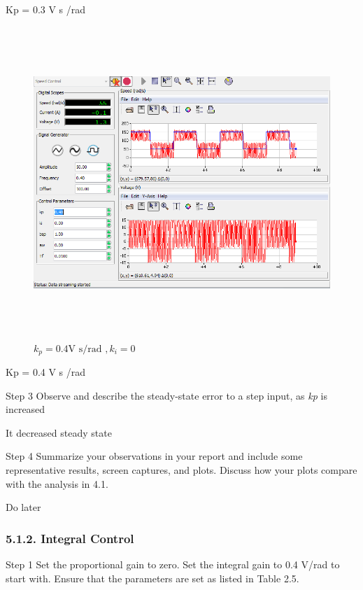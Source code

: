 \documentclass[]{article}
\begin{document}
Kp = 0.3 V s /rad

\begin{figure}\includegraphics[width=6.50000in,height=4.63889in]{media/image16.png} \caption{$k_p = 0.4 \text{V s/rad }, k_i = 0$} \end{figure}
Kp = 0.4 V s /rad

Step 3 Observe and describe the steady-state error to a step input, as
\emph{kp} is increased

It decreased steady state

Step 4 Summarize your observations in your report and include some
representative results, screen captures, and plots. Discuss how your
plots compare with the analysis in 4.1.

Do later

\subsubsection{5.1.2. Integral Control}\label{integral-control}

Step 1 Set the proportional gain to zero. Set the integral gain to 0.4
V/rad to start with. Ensure that the parameters are set as listed in
Table 2.5.
\end{document}
